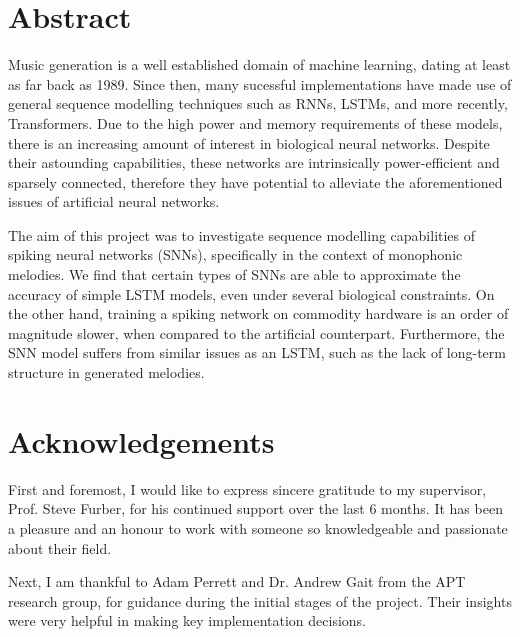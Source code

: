 \documentclass[../report.tex]{subfiles}
\begin{document}
\section*{Abstract}
Music generation is a well established domain of machine learning, dating at least as far back as 1989. Since then, many sucessful implementations have made use of general sequence modelling techniques such as RNNs, LSTMs, and more recently, Transformers. Due to the high power and memory requirements of these models, there is an increasing amount of interest in biological neural networks. Despite their astounding capabilities, these networks are intrinsically power-efficient and sparsely connected, therefore they have potential to alleviate the aforementioned issues of artificial neural networks.

The aim of this project was to investigate sequence modelling capabilities of spiking neural networks (SNNs), specifically in the context of monophonic melodies. We find that certain types of SNNs are able to approximate the accuracy of simple LSTM models, even under several biological constraints. On the other hand, training a spiking network on commodity hardware is an order of magnitude slower, when compared to the artificial counterpart. Furthermore, the SNN model suffers from similar issues as an LSTM, such as the lack of long-term structure in generated melodies.

\section*{Acknowledgements}
First and foremost, I would like to express sincere gratitude to my supervisor, Prof. Steve Furber, for his continued support over the last 6 months. It has been a pleasure and an honour to work with someone so knowledgeable and passionate about their field.

Next, I am thankful to Adam Perrett and Dr. Andrew Gait from the APT research group, for guidance during the initial stages of the project. Their insights were very helpful in making key implementation decisions.
\end{document}
